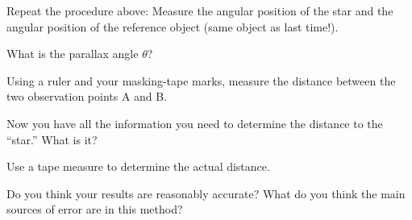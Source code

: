 Repeat the procedure above: Measure the angular position of the
star and the angular position of the reference object (same object
as last time!).  

\vskip 2.5in

What is the parallax angle $\theta$?

\vskip 1in

Using a ruler and your masking-tape marks, measure the distance between
the two observation points A and B.

\vskip 1in

Now you have all the information you need to determine the distance to
the ``star.''  What is it?

\vskip 1in

Use a tape measure to determine the actual distance.

\vskip 1in

Do you think your results are reasonably accurate?  What
do you think the main sources of error are in this method?






